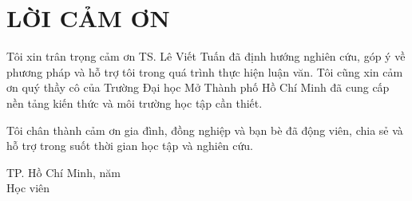 \chapter*{LỜI CẢM ƠN}

Tôi xin trân trọng cảm ơn TS. Lê Viết Tuấn đã định hướng nghiên cứu, góp ý về phương pháp và hỗ trợ tôi trong quá trình thực hiện luận văn. Tôi cũng xin cảm ơn quý thầy cô của Trường Đại học Mở Thành phố Hồ Chí Minh đã cung cấp nền tảng kiến thức và môi trường học tập cần thiết.

Tôi chân thành cảm ơn gia đình, đồng nghiệp và bạn bè đã động viên, chia sẻ và hỗ trợ trong suốt thời gian học tập và nghiên cứu.

\begin{flushright}
TP. Hồ Chí Minh, năm \ThesisYear\\
Học viên\\[1.5cm]
\ThesisAuthor
\end{flushright}
